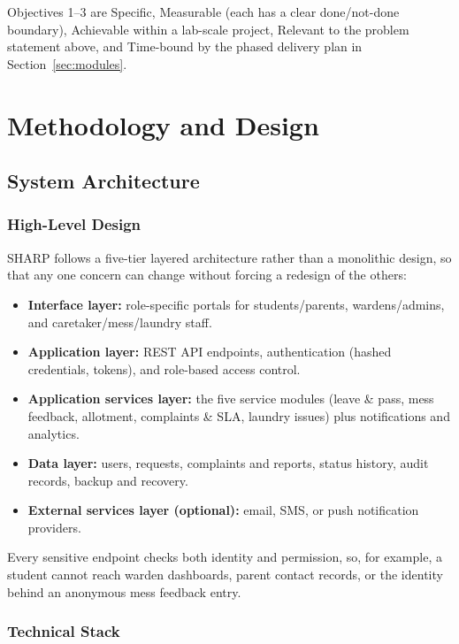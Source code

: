 \documentclass{tietreport}
\begin{document}
Objectives 1--3 are Specific, Measurable (each has a clear
done/not-done boundary), Achievable within a lab-scale project,
Relevant to the problem statement above, and Time-bound by the phased
delivery plan in Section~\ref{sec:modules}.

\chapter{Methodology and Design}
\label{ch:design}

\section{System Architecture}

\subsection{High-Level Design}

SHARP follows a five-tier layered architecture rather than a monolithic
design, so that any one concern can change without forcing a redesign of
the others:

\begin{itemize}
  \item \textbf{Interface layer:} role-specific portals for
    students/parents, wardens/admins, and caretaker/mess/laundry staff.
  \item \textbf{Application layer:} REST API endpoints, authentication
    (hashed credentials, tokens), and role-based access control.
  \item \textbf{Application services layer:} the five service modules
    (leave \& pass, mess feedback, allotment, complaints \& SLA, laundry
    issues) plus notifications and analytics.
  \item \textbf{Data layer:} users, requests, complaints and reports,
    status history, audit records, backup and recovery.
  \item \textbf{External services layer (optional):} email, SMS, or push
    notification providers.
\end{itemize}

Every sensitive endpoint checks both identity and permission, so, for
example, a student cannot reach warden dashboards, parent contact records,
or the identity behind an anonymous mess feedback entry.

\subsection{Technical Stack}
\end{document}
